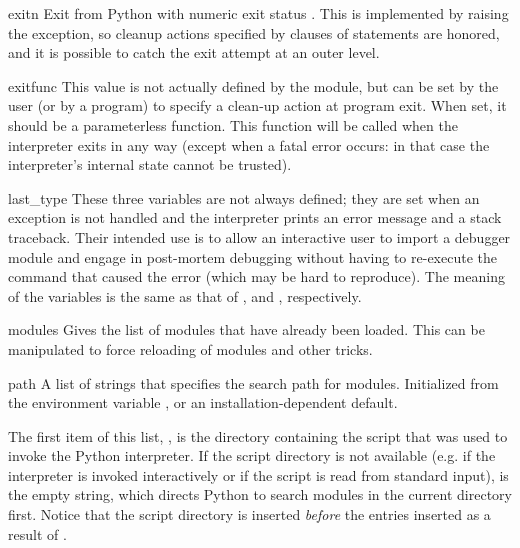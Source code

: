 \begin{funcdesc}{exit}{n}
  Exit from Python with numeric exit status .  This is
  implemented by raising the  exception, so cleanup
  actions specified by  clauses of  statements
  are honored, and it is possible to catch the exit attempt at an outer
  level.
\end{funcdesc}

\begin{datadesc}{exitfunc}
  This value is not actually defined by the module, but can be set by
  the user (or by a program) to specify a clean-up action at program
  exit.  When set, it should be a parameterless function.  This function
  will be called when the interpreter exits in any way (except when a
  fatal error occurs: in that case the interpreter's internal state
  cannot be trusted).
\end{datadesc}

\begin{datadesc}{last_type}
  These three variables are not always defined; they are set when an
  exception is not handled and the interpreter prints an error message
  and a stack traceback.  Their intended use is to allow an interactive
  user to import a debugger module and engage in post-mortem debugging
  without having to re-execute the command that caused the error (which
  may be hard to reproduce).  The meaning of the variables is the same
  as that of ,  and ,
  respectively.
\end{datadesc}

\begin{datadesc}{modules}
  Gives the list of modules that have already been loaded.
  This can be manipulated to force reloading of modules and other tricks.
\end{datadesc}

\begin{datadesc}{path}
  A list of strings that specifies the search path for modules.
  Initialized from the environment variable , or an
  installation-dependent default.  

The first item of this list, , is the 
directory containing the script that was used to invoke the Python 
interpreter.  If the script directory is not available (e.g.  if the 
interpreter is invoked interactively or if the script is read from 
standard input),  is the empty string, which directs 
Python to search modules in the current directory first.  Notice that 
the script directory is inserted {\em before} the entries inserted as 
a result of .  
\end{datadesc}

